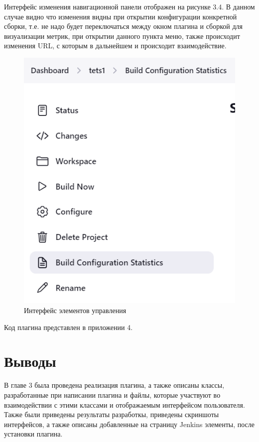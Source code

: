 Интерфейс изменения навигационной панели отображен на рисунке 3.4. В данном случае видно что изменения видны при открытии конфигурации конкретной сборки, т.е. не надо будет переключаться между окном плагина и сборкой для визуализации метрик, при открытии данного пункта меню, также происходит изменения URL, с которым в дальнейшем и происходит взаимодействие.

\begin{figure}[ht!] 
	\center
	\includegraphics [scale=0.47] {my_folder/images//ui3}
	\caption{Интерфейс элементов управления} 
	\label{fig:ArchitectureJenkins}  
\end{figure}


Код плагина представлен в приложении 4.
 
\section{Выводы} \label{ch3:sec3}

В главе 3 была проведена реализация плагина, а также описаны классы, разработанные при написании плагина и файлы, которые участвуют во взаимодействии с этими классами и отображаемым интерфейсом пользователя. Также были приведены результаты разработкы, приведены скриншоты интерфейсов, а также описаны добавленные на страницу Jenkins элементы, после установки плагина.





